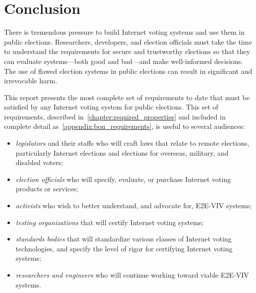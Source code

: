 \chapter{Conclusion}
\label{chapter:conclusion}

There is tremendous pressure to build Internet voting systems and use
them in public elections. Researchers, developers, and election
officials must take the time to understand the requirements for secure
and trustworthy elections so that they can evaluate systems---both
good and bad---and make well-informed decisions.  The use of flawed
election systems in public elections can result in significant and
irrevocable harm.

This report presents the most complete set of requirements to
date that must be satisfied by any Internet voting system for public
elections. This set of requirements, described
in~\autoref{chapter:required_properties} and included in complete
detail as~\autoref{appendix:bon_requirements}, is useful to several
audiences:
\begin{itemize}
\item \emph{legislators} and their staffs who will craft laws that
  relate to remote elections, particularly Internet elections and
  elections for overseas, military, and disabled voters;
\item \emph{election officials} who will specify, evaluate, or
  purchase Internet voting products or services;
\item \emph{activists} who wish to better understand, and advocate
  for, E2E-VIV systems;
\item \emph{testing organizations} that will certify Internet voting
  systems;
\item \emph{standards bodies} that will standardize various classes of
  Internet voting technologies, and specify the level of rigor for
  certifying Internet voting systems;
\item \emph{researchers and engineers} who will continue working
  toward viable E2E-VIV systems.
\end{itemize}

